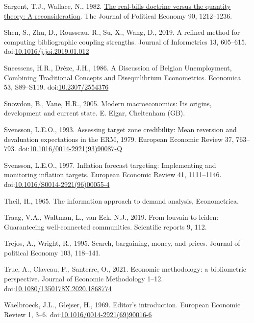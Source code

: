 \documentclass[
  12pt,
  onecolumn]{article}
\newlength{\cslhangindent}
\newlength{\cslentryspacingunit} %
\newenvironment{CSLReferences}[2] %
 {%
  \setlength{\parindent}{0pt}
  \ifodd #1
  \let\oldpar\par
  \def\par{\hangindent=\cslhangindent\oldpar}
  \fi
  \setlength{\parskip}{#2\cslentryspacingunit}
 }%
 {}
\begin{document}
\begin{CSLReferences}{1}{0}
\leavevmode{}%
Sargent, T.J., Wallace, N., 1982.
\href{http://www.jstor.org/stable/1830945}{The real-bills doctrine
versus the quantity theory: {A} reconsideration}. The Journal of
Political Economy 90, 1212--1236.

\leavevmode{}%
Shen, S., Zhu, D., Rousseau, R., Su, X., Wang, D., 2019. A refined
method for computing bibliographic coupling strengths. Journal of
Informetrics 13, 605--615.
doi:\href{https://doi.org/10.1016/j.joi.2019.01.012}{10.1016/j.joi.2019.01.012}

\leavevmode{}%
Sneessens, H.R., Drèze, J.H., 1986. A {Discussion} of {Belgian
Unemployment}, {Combining Traditional Concepts} and {Disequilibrium
Econometrics}. Economica 53, S89--S119.
doi:\href{https://doi.org/10.2307/2554376}{10.2307/2554376}

\leavevmode{}%
Snowdon, B., Vane, H.R., 2005. Modern macroeconomics: Its origins,
development and current state. {E. Elgar}, {Cheltenham (GB)}.

\leavevmode{}%
Svensson, L.E.O., 1993. Assessing target zone credibility: {Mean}
reversion and devaluation expectations in the {ERM},
1979. European Economic Review 37, 763--793.
doi:\href{https://doi.org/10.1016/0014-2921(93)90087-Q}{10.1016/0014-2921(93)90087-Q}

\leavevmode{}%
Svensson, L.E.O., 1997. Inflation forecast targeting: {Implementing} and
monitoring inflation targets. European Economic Review 41, 1111--1146.
doi:\href{https://doi.org/10.1016/S0014-2921(96)00055-4}{10.1016/S0014-2921(96)00055-4}

\leavevmode{}%
Theil, H., 1965. The information approach to demand analysis,
Econometrica.

\leavevmode{}%
Traag, V.A., Waltman, L., van Eck, N.J., 2019. From louvain to leiden:
Guaranteeing well-connected communities. Scientific reports 9, 112.

\leavevmode{}%
Trejos, A., Wright, R., 1995. Search, bargaining, money, and prices.
Journal of political Economy 103, 118--141.

\leavevmode{}%
Truc, A., Claveau, F., Santerre, O., 2021. Economic methodology: a
bibliometric perspective. Journal of Economic Methodology 1--12.
doi:\href{https://doi.org/10.1080/1350178X.2020.1868774}{10.1080/1350178X.2020.1868774}

\leavevmode{}%
Waelbroeck, J.L., Glejser, H., 1969. Editor's introduction. European
Economic Review 1, 3--6.
doi:\href{https://doi.org/10.1016/0014-2921(69)90016-6}{10.1016/0014-2921(69)90016-6}

\end{CSLReferences}
\end{document}
